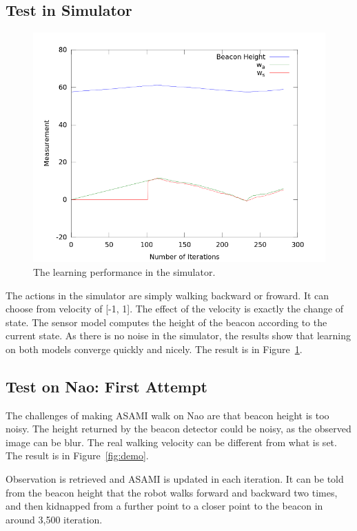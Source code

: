 \documentclass[10pt]{article}
\begin{document}
\subsection{Test in Simulator}

\begin{figure}
\centering
\includegraphics[width=0.7\columnwidth]{simResult.png}
\caption{The learning performance in the simulator.}
\label{fig:sim}
\end{figure}

The actions in the simulator are simply walking backward or froward.
It can choose from velocity of [-1, 1]. The effect of the velocity is
exactly the change of state.
The sensor model computes the height of the beacon according to the
current state. As there is no noise in the simulator, the results show
that learning on both models converge quickly and nicely. The result
is in Figure~\ref{fig:sim}.

\subsection{Test on Nao: First Attempt}
\label{nao:1st}

The challenges of making ASAMI walk on Nao are that beacon height is
too noisy. The height returned by the beacon detector could be noisy,
as the observed image can be blur. The real walking velocity can be
different from what is set. The result is in Figure~\ref{fig:demo}.

Observation is retrieved and ASAMI is updated in each iteration. It
can be told from the beacon height that the robot walks forward and
backward two times, and then kidnapped from a further point to a
closer point to the beacon in around 3,500 iteration.
\end{document}
